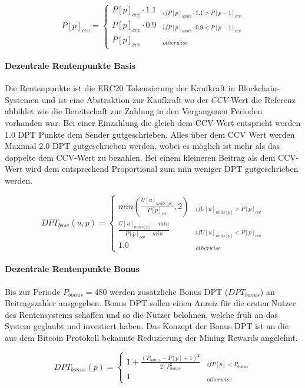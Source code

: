 \begin{equation}
P[p]_{ccv} = \begin{cases} 
P[p]_{ccv} \cdot 1.1 & _{if P[p]_{units} \cdot 1.1 > P[p-1]_{ccv}} \\
P[p]_{ccv} \cdot 0.9 & _{if P[p]_{units} \cdot 0.9 < P[p-1]_{ccv}} \\
P[p]_{ccv} & _{otherwise}
\end{cases}
\end{equation}

\paragraph*{Dezentrale Rentenpunkte Basis}
Die Rentenpunkte ist die ERC20 Tokensierung der Kaufkraft in Blockchain-Systemen und ist eine Abstraktion zur Kaufkraft wo der $CCV$-Wert die Referenz abbildet wie die Bereitschaft zur Zahlung in den Vergangenen Perioden vorhanden war. Bei einer Einzahlung die gleich dem CCV-Wert entspricht werden 1.0 DPT Punkte dem Sender gutgeschrieben. Alles über dem CCV Wert werden Maximal 2.0 DPT gutgeschrieben werden, wobei es möglich ist mehr als das doppelte dem CCV-Wert zu bezahlen. Bei einem kleineren Beitrag als dem CCV-Wert wird dem entsprechend Proportional zum min weniger DPT gutgeschrieben werden.

\begin{dmath}
DPT_{base}(u, p) = \begin{cases} 
min(\frac{U[u]_{units[p]}} {P[p]_{ccv}}, 2) 
  & _{if U[u]_{units[p]} > P[p]_{ccv}} \\
\frac{U[u]_{units[p]} - min} {P[p]_{ccv} - min} 
  & _{if U[u]_{units[p]} < P[p]_{ccv}} \\
1.0 & _{otherwise}
\end{cases}
\end{dmath}

\paragraph*{Dezentrale Rentenpunkte Bonus}
Bis zur Periode $P_{bonus} = 480$ werden zusätzliche Bonus DPT 
($DPT_{bonus}$) an
Beitragszahler ausgegeben. Bonus DPT sollen einen Anreiz für
die ersten Nutzer des Rentensystems schaffen und so die Nutzer belohnen, 
welche früh an das System geglaubt und investiert haben. Das Konzept der Bonus DPT
ist an die aus dem Bitcoin Protokoll bekannte Reduzierung der Mining Rewards angelehnt.

\begin{equation}
DPT_{bonus}(p) = \begin{cases} 
1 + \frac{(P_{bonus} - P[p] + 1)^2}
      {2 \cdot P_{bonus}^2} & _{if P[p] < P_{bonus}} \\
1 & _{otherwise} 
\end{cases}
\end{equation}


